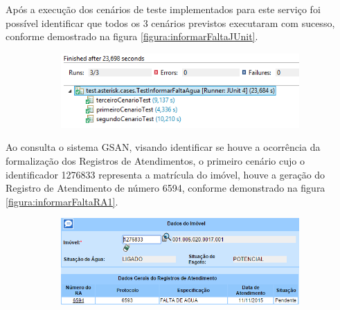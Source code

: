  Após a execução dos cenários de teste implementados para este serviço foi possível identificar que todos os 3 cenários previstos executaram com sucesso, conforme demostrado na figura \ref{figura:informarFaltaJUnit}.	

	\begin{figure}[H]
		\centering
		\caption{\textbf{Informar Falta de Água - Detalhes execução dos testes}}
		\label{figura:informarFaltaJUnit}
		\begin{subfigure}[H]{\textwidth}
			\centering
			\includegraphics{figuras/cenarios/informar_falta_agua/junit_result.PNG}
		\end{subfigure}
	\end{figure}

Ao consulta o sistema GSAN, visando identificar se houve a ocorrência da formalização dos Registros de Atendimentos, o primeiro cenário cujo o identificador 1276833 representa a matrícula do imóvel, houve a geração do Registro de Atendimento de número 6594, conforme demonstrado na figura \ref{figura:informarFaltaRA1}.

\begin{figure}[H]
	\centering
		\caption{\textbf{Informar Falta de Água - RA gerado para o Cenário 1}}
		\label{figura:informarFaltaRA1}
	\begin{subfigure}[H]{\textwidth}
		\centering
		\includegraphics{figuras/cenarios/informar_falta_agua/resultado_1.PNG}
	\end{subfigure}
\end{figure}

